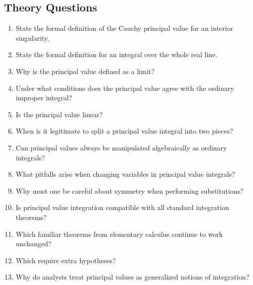 \subsection{Theory Questions}

\begin{enumerate}[resume]
  \item State the formal definition of the Cauchy principal value for an interior singularity.
  \item State the formal definition for an integral over the whole real line.
  \item Why is the principal value defined as a limit?
  \item Under what conditions does the principal value agree with the ordinary improper integral?
  \item Is the principal value linear?
  \item When is it legitimate to split a principal value integral into two pieces?
  \item Can principal values always be manipulated algebraically as ordinary integrals?
  \item What pitfalls arise when changing variables in principal value integrals?
  \item Why must one be careful about symmetry when performing substitutions?
  \item Is principal value integration compatible with all standard integration theorems?
  \item Which familiar theorems from elementary calculus continue to work unchanged?
  \item Which require extra hypotheses?
  \item Why do analysts treat principal values as generalized notions of integration?
\end{enumerate}
